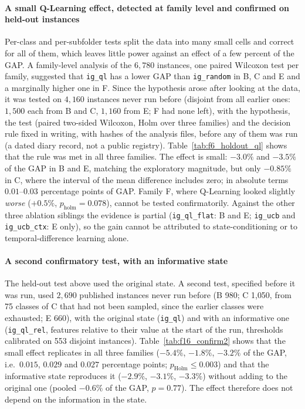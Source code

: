 \documentclass[final,3p,times,11pt,authoryear]{elsarticle}
\begin{document}
\paragraph{A small Q-Learning effect, detected at family level and
confirmed on held-out instances}
Per-class and per-subfolder tests split the data into many small cells and
correct for all of them, which leaves little power against an effect of a
few percent of the GAP. A family-level analysis of the $6{,}780$ instances,
one paired Wilcoxon test per family, suggested that \texttt{ig\_ql} has a
lower GAP than \texttt{ig\_random} in B, C and E and a marginally higher
one in F. Since the hypothesis arose after looking at the data, it was
tested on $4{,}160$ instances never run before (disjoint from all earlier
ones: $1{,}500$ each from B and C, $1{,}160$ from E; F had none left), with
the hypothesis, the test (paired two-sided Wilcoxon, Holm over three
families) and the decision rule fixed in writing, with hashes of the
analysis files, before any of them was run (a dated diary record, not a
public registry). Table~\ref{tab:f6_holdout_ql} shows that the rule was
met in all three families. The effect is small: $-3.0\%$ and $-3.5\%$ of
the GAP in B and E, matching the exploratory magnitude, but only
$-0.85\%$ in C, where the interval of the mean difference includes zero;
in absolute terms $0.01$--$0.03$ percentage points of GAP. Family F, where
Q-Learning looked slightly \emph{worse} ($+0.5\%$, $p_{\mathrm{holm}}=0.078$),
cannot be tested confirmatorily. Against the other three ablation siblings
the evidence is partial (\texttt{ig\_ql\_flat}: B and E; \texttt{ig\_ucb}
and \texttt{ig\_ucb\_ctx}: E only), so the gain cannot be attributed to
state-conditioning or to temporal-difference learning alone.


\paragraph{A second confirmatory test, with an informative state}
The held-out test above used the original state. A second test, specified
before it was run, used $2{,}690$ published instances never run before (B 980;
C 1{,}050, from 75 classes of C that had not been sampled, since the earlier
classes were exhausted; E 660), with the original state (\texttt{ig\_ql}) and
with an informative one (\texttt{ig\_ql\_rel}, features relative to their value
at the start of the run, thresholds calibrated on 553 disjoint instances).
Table~\ref{tab:f16_confirm2} shows that the small effect replicates in all three
families ($-5.4\%$, $-1.8\%$, $-3.2\%$ of the GAP, i.e.\ $0.015$, $0.029$ and
$0.027$ percentage points; $p_{\mathrm{Holm}} \leq 0.003$) and that the
informative state reproduces it ($-2.9\%$, $-3.1\%$, $-3.3\%$) without adding to
the original one (pooled $-0.6\%$ of the GAP, $p=0.77$). The effect therefore does
not depend on the information in the state.
\end{document}
